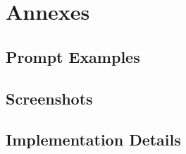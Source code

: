 \appendix
\chapter{Annexes}


\section{Prompt Examples}

\section{Screenshots}

\section{Implementation Details}
